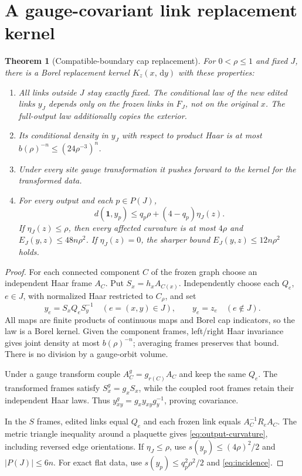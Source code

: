 \documentclass[11pt]{article}
\newtheorem{theorem}{Theorem}[section]
\theoremstyle{definition}
\theoremstyle{remark}
\newcommand{\one}{\mathbf1}
\newcommand{\dd}{\,\mathrm d}
\begin{document}
\section{A gauge-covariant link replacement kernel}
\begin{theorem}[Compatible-boundary cap replacement]\label{thm:kernel}
For $0<\rho\le1$ and fixed $J$, there is a Borel replacement kernel
$K_z(x,\dd y)$ with these properties:
\begin{enumerate}
\item All links outside $J$ stay exactly fixed. The conditional law of the
new edited links $y_J$ depends only on the frozen links in $F_J$, not
on the original $x$. The full-output law additionally copies the exterior.
\item Its conditional density in $y_J$ with respect to product Haar is at
most $b(\rho)^{-n}\le(24\rho^{-3})^n$.
\item Under every site gauge transformation it pushes forward to the
kernel for the transformed data.
\item For every output and each $p\in P(J)$,
\begin{equation}
 d(\one,y_p)\le q_p\rho+(4-q_p)\eta_J(z).\label{eq:output-curvature}
\end{equation}
If $\eta_J(z)\le\rho$, then every affected curvature is at most $4\rho$
and $E_J(y,z)\le48n\rho^2$. If $\eta_J(z)=0$, the sharper bound
$E_J(y,z)\le12n\rho^2$ holds.
\end{enumerate}
\end{theorem}
\begin{proof}
For each connected component $C$ of the frozen graph choose an independent
Haar frame $A_C$. Put $S_x=h_xA_{C(x)}$.
Independently choose each $Q_e$, $e\in J$, with normalized Haar restricted
to $C_\rho$, and set
\begin{equation}
 y_e=S_xQ_eS_y^{-1}\quad(e=(x,y)\in J),\qquad
 y_e=z_e\quad(e\notin J).\label{eq:kernel}
\end{equation}
All maps are finite products of continuous maps and Borel cap indicators,
so the law is a Borel kernel. Given the component frames, left/right Haar
invariance gives joint density at most $b(\rho)^{-n}$; averaging frames
preserves that bound. There is no division by a gauge-orbit volume.

Under a gauge transform couple $A_C^g=g_{r(C)}A_C$ and keep the same
$Q_e$. The transformed frames satisfy $S_x^g=g_xS_x$, while the coupled
root frames retain their independent Haar laws. Thus
$y_{xy}^g=g_xy_{xy}g_y^{-1}$, proving covariance.

In the $S$ frames, edited links equal $Q_e$ and each frozen link equals
$A_C^{-1}R_eA_C$. The metric triangle inequality around a plaquette gives
\eqref{eq:output-curvature}, including reversed edge orientations.
If $\eta_J\le\rho$, use
$s(y_p)\le(4\rho)^2/2$ and $|P(J)|\le6n$. For exact flat data, use
$s(y_p)\le q_p^2\rho^2/2$ and \eqref{eq:incidence}.
\end{proof}
\end{document}

